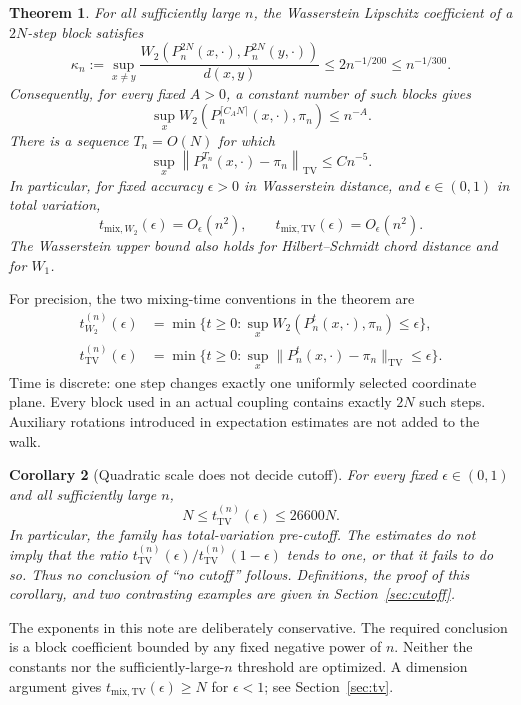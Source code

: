 \documentclass[11pt]{article}
\newtheorem{theorem}{Theorem}[section]
\newtheorem{corollary}[theorem]{Corollary}
\theoremstyle{definition}\newtheorem{definition}[theorem]{Definition}
\theoremstyle{remark}\newtheorem{remark}[theorem]{Remark}
\newcommand{\TV}{\mathrm{TV}}
\newcommand{\norm}[1]{\left\lVert#1\right\rVert}
\begin{document}
\begin{theorem}\label{thm:main}
For all sufficiently large $n$, the Wasserstein Lipschitz coefficient of a $2N$-step block satisfies
\begin{equation}\label{eq:main-kappa}
 \kappa_n:=\sup_{x\ne y}
 \frac{W_2(P_n^{2N}(x,\cdot),P_n^{2N}(y,\cdot))}{d(x,y)}
 \le 2n^{-1/200}\le n^{-1/300}.
\end{equation}
Consequently, for every fixed $A>0$, a constant number of such blocks gives
\[
 \sup_x W_2(P_n^{\lceil C_A N\rceil}(x,\cdot),\pi_n)\le n^{-A}.
\]
There is a sequence $T_n=O(N)$ for which
\[
 \sup_x\norm{P_n^{T_n}(x,\cdot)-\pi_n}_{\TV}\le Cn^{-5}.
\]
In particular, for fixed accuracy $\epsilon>0$ in Wasserstein distance, and $\epsilon\in(0,1)$ in total variation,
\[
 t_{\mathrm{mix},W_2}(\epsilon)=O_\epsilon(n^2),\qquad
 t_{\mathrm{mix},\TV}(\epsilon)=O_\epsilon(n^2).
\]
The Wasserstein upper bound also holds for Hilbert--Schmidt chord distance and for $W_1$.
\end{theorem}

For precision, the two mixing-time conventions in the theorem are
\[
\begin{aligned}
 t_{W_2}^{(n)}(\epsilon)
 &=\min\{t\ge0:\sup_xW_2(P_n^t(x,\cdot),\pi_n)\le\epsilon\},\\
 t_{\TV}^{(n)}(\epsilon)
 &=\min\{t\ge0:\sup_x\|P_n^t(x,\cdot)-\pi_n\|_{\TV}\le\epsilon\}.
\end{aligned}
\]
Time is discrete: one step changes exactly one uniformly selected coordinate plane. Every block used in an actual coupling contains exactly $2N$ such steps. Auxiliary rotations introduced in expectation estimates are not added to the walk.

\begin{corollary}[Quadratic scale does not decide cutoff]\label{cor:precutoff}
For every fixed $\epsilon\in(0,1)$ and all sufficiently large $n$,
\[
 N\le t_{\TV}^{(n)}(\epsilon)\le26600N.
\]
In particular, the family has total-variation pre-cutoff. The estimates do not imply that the ratio
$t_{\TV}^{(n)}(\epsilon)/t_{\TV}^{(n)}(1-\epsilon)$ tends to one, or that it fails to do so. Thus no conclusion of ``no cutoff'' follows. Definitions, the proof of this corollary, and two contrasting examples are given in Section~\ref{sec:cutoff}.
\end{corollary}


The exponents in this note are deliberately conservative. The required conclusion is a block coefficient bounded by any fixed negative power of $n$. Neither the constants nor the sufficiently-large-$n$ threshold are optimized. A dimension argument gives $t_{\mathrm{mix},\TV}(\epsilon)\ge N$ for $\epsilon<1$; see Section~\ref{sec:tv}.
\end{document}
